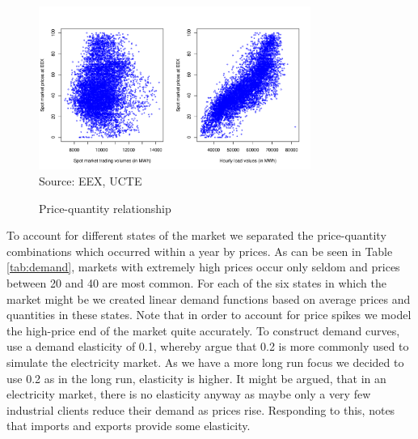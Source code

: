 \begin{figure}[htb]
  \centering
\caption{Price-quantity relationship}
  \includegraphics[width=3.5in]{germandata/pricequant.pdf}
  \label{fig:pricequant}
\\
 \scriptsize Source: EEX, UCTE
\end{figure}

To account for different states of the market we separated the price-quantity combinations which occurred within a year by prices. As can be seen in Table \ref{tab:demand}, markets with extremely high prices occur only seldom and prices between 20 and 40 are most common. For each of the six states in which the market might be we created linear demand functions based on average prices and quantities in these states. Note that in order to account for price spikes we model the high-price end of the market quite accurately. To construct demand curves, \cite{Neuhoff2005} use a demand elasticity of 0.1, whereby \cite{Genc2007} argue that 0.2 is more commonly used to simulate the electricity market. As we have a more long run focus we decided to use 0.2 as in the long run, elasticity is higher. It might be argued, that in an electricity market, there is no elasticity anyway as maybe only a very few industrial clients reduce their demand as prices rise. Responding to this, \cite{Bushnell2003} notes that imports and exports provide some elasticity.

